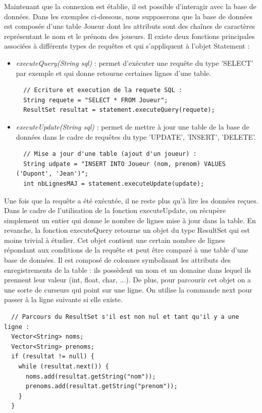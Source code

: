 Maintenant que la connexion est établie, il est possible d'interagir avec la base de données. Dans les exemples ci-dessous, nous supposerons que la base de données est composée d'une table Joueur dont les attributs sont des chaînes de caractères représentant le nom et le prénom des joueurs. Il existe deux fonctions principales associées à différents types de requêtes et qui s'appliquent à l'objet Statement :
\begin{itemize}
 \item \textit{executeQuery(String sql)} : permet d'exécuter une requête du type 'SELECT' par exemple et qui donne retourne certaines lignes d'une table.
\begin{lstlisting}  
  // Ecriture et execution de la requete SQL :
  String requete = "SELECT * FROM Joueur";
  ResultSet resultat = statement.executeQuery(requete);
\end{lstlisting}
 \item \textit{executeUpdate(String sql)} : permet de mettre à jour une table de la base de données dans le cadre de requêtes du type 'UPDATE', 'INSERT', 'DELETE'.
\begin{lstlisting}
  // Mise a jour d'une table (ajout d'un joueur) :
  String udpate = "INSERT INTO Joueur (nom, prenom) VALUES ('Dupont', 'Jean')";
  int nbLignesMAJ = statement.executeUpdate(update);
\end{lstlisting}
\end{itemize}

Une fois que la requête a été exécutée, il ne reste plus qu'à lire les données reçues. Dans le cadre de l'utilisation de la fonction executeUpdate, on récupère simplement un entier qui donne le nombre de lignes mise à jour dans la table. En revanche, la fonction executeQuery retourne un objet du type ResultSet qui est moins trivial à étudier. Cet objet contient une certain nombre de lignes répondant aux conditions de la requête et peut être comparé à une table d'une base de données. Il est composé de colonnes symbolisant les attributs des enregistrements de la table : ils possèdent un nom et un domaine dans lequel ils prennent leur valeur (int, float, char, ...). De plus, pour parcourir cet objet on a une sorte de curseurs qui point sur une ligne. On utilise la commande next pour passer à la ligne suivante si elle existe.
\begin{lstlisting}  
  // Parcours du ResultSet s'il est non nul et tant qu'il y a une ligne :
  Vector<String> noms;
  Vector<String> prenoms;
  if (resultat != null) {
    while (resultat.next()) {
      noms.add(resultat.getString("nom"));
      prenoms.add(resultat.getString("prenom"));
    }
  }
\end{lstlisting}

